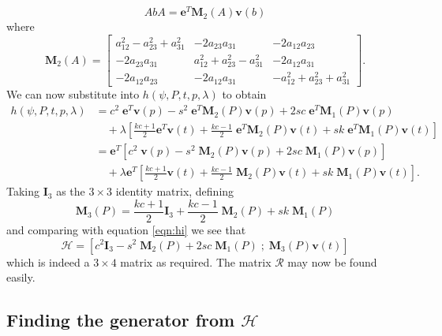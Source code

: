 \[
AbA = \mathbf{e}^T \mathbf{M}_2(A) \mathbf{v}(b)
\]
where
\[
\mathbf{M}_2(A)  =
\left[
\begin{array}{ccc}
a^2_{12} - a^2_{23} + a^2_{31} &  - 2a_{23}a_{31} & - 2a_{12}a_{23} \\
- 2a_{23}a_{31} & a^2_{12} + a^2_{23} - a^2_{31} & - 2a_{12}a_{31}  \\
- 2a_{12}a_{23} & - 2a_{12}a_{31} &  -a^2_{12} + a^2_{23} + a^2_{31} 
\end{array}
\right].
\]
We can now substitute into $h(\psi, P, t, p,\lambda)$ to obtain
\begin{align*}
h(\psi, P, t, p, \lambda) &= c^2\;\mathbf{e}^T\mathbf{v}(p) - s^2\;\mathbf{e}^T\mathbf{M}_2(P)\mathbf{v}(p) + 2sc\;\mathbf{e}^T\mathbf{M}_1(P)\mathbf{v}(p) \\
&\quad+ \lambda\left[ 
 \frac{kc+1}{2} \mathbf{e}^T\mathbf{v}(t) + \frac{kc-1}{2} \;\mathbf{e}^T\mathbf{M}_2(P)\mathbf{v}(t)
+ sk\;\mathbf{e}^T\mathbf{M}_1(P)\mathbf{v}(t)
 \right] \\
& = \mathbf{e}^T \left[ 
 c^2\;\mathbf{v}(p) - s^2\;\mathbf{M}_2(P)\mathbf{v}(p) + 2sc\;\mathbf{M}_1(P)\mathbf{v}(p) 
\right] \\
&\quad+ \lambda\mathbf{e}^T\left[ 
 \frac{kc+1}{2} \mathbf{v}(t) + \frac{kc-1}{2} \;\mathbf{M}_2(P)\mathbf{v}(t)
+ sk\;\mathbf{M}_1(P)\mathbf{v}(t)
 \right].
\end{align*}
Taking $\mathbf{I}_3$ as the $3\times3$ identity matrix, defining
\[
\mathbf{M}_3(P) = \frac{kc+1}{2} \mathbf{I}_3 
+ \frac{kc-1}{2} \;\mathbf{M}_2(P) + sk\;\mathbf{M}_1(P)
\]
and comparing with 
equation \ref{eqn:hi} we see that
\[
\mathcal{H} = \left[
 c^2\mathbf{I}_3 - s^2\;\mathbf{M}_2(P) + 2sc\;\mathbf{M}_1(P) \; ; \;
 \mathbf{M}_3(P)\mathbf{v}(t)
\right]
\]
which is indeed a $3\times4$ matrix as required. The matrix $\mathcal{R}$ may
now be found easily.

\subsection{Finding the generator from $\mathcal{H}$}

